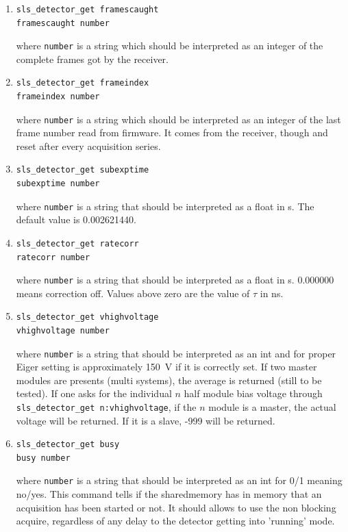 \documentclass{article}
\begin{document}
\begin{enumerate}
\item \begin{verbatim}
sls_detector_get framescaught
framescaught number
\end{verbatim}
where {\tt{number}} is a string which should be interpreted as an integer of the complete frames got by the receiver.

\item \begin{verbatim}
sls_detector_get frameindex
frameindex number
\end{verbatim}
where {\tt{number}} is a string which should be interpreted as an integer of the last frame number read from firmware. It comes from the receiver, though and reset after every acquisition series.

\item \begin{verbatim}
sls_detector_get subexptime
subexptime number
\end{verbatim}
where {\tt{number}} is a string that should be interpreted as a float in s. The default value is 0.002621440. 

\item \begin{verbatim}
sls_detector_get ratecorr
ratecorr number
\end{verbatim}
where {\tt{number}} is a string that should be interpreted as a float in s.  0.000000 means correction off. Values above zero are the value of $\tau$ in ns.

\item \begin{verbatim}
sls_detector_get vhighvoltage
vhighvoltage number
\end{verbatim}
where {\tt{number}} is a string that should be interpreted as an int and for proper Eiger setting is approximately 150~V if it is correctly set. If two master modules are presents (multi systems), the average is returned (still to be tested). If one asks for the individual $n$ half module bias voltage through {\tt{sls\_detector\_get n:vhighvoltage}}, if the $n$ module is a master, the actual voltage will be returned. If it is a slave, -999 will be returned. 
  
\item \begin{verbatim}
sls_detector_get busy
busy number
\end{verbatim}
where  {\tt{number}} is a string that should be interpreted as an int for 0/1 meaning no/yes. This command tells if the sharedmemory has in memory that an acquisition has been started or not. It should allows to use the non blocking acquire, regardless of any delay to the detector getting into 'running' mode. 


\end{enumerate}
\end{document}
